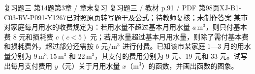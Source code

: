 \par\noindent\begin{minipage}{\linewidth}
\begin{bankitem}{复习题三 第14题}{第3章 / 章末复习 复习题三 / 教材 p.91 / PDF 第98页}{XJ-B1-C03-RV-P091-Y1267}{已对照原页转写题干及公式；待教师复核；未制作答案}
某市对家庭每月用水的收费规定为：若用水量不超过基本月用水量 $a\,\mathrm{m^3}$，则只付基本费 8 元和损耗费 $c\ (c<5)$ 元；若用水量超过基本月用水量，则除了需付基本费和损耗费外，超过部分还需按 $b$ 元/$\mathrm{m^3}$ 进行付费。已知该市某家庭 1—3 月的用水量分别为 $9\,\mathrm{m^3},15\,\mathrm{m^3}$ 和 $22\,\mathrm{m^3}$，其支付的费用分别为 9 元、19 元和 33 元。试写出每月支付费用 $y$（元）关于月用水量 $x$（$\mathrm{m^3}$）的函数，并画出函数的图象。
\end{bankitem}
\end{minipage}\par\medskip
